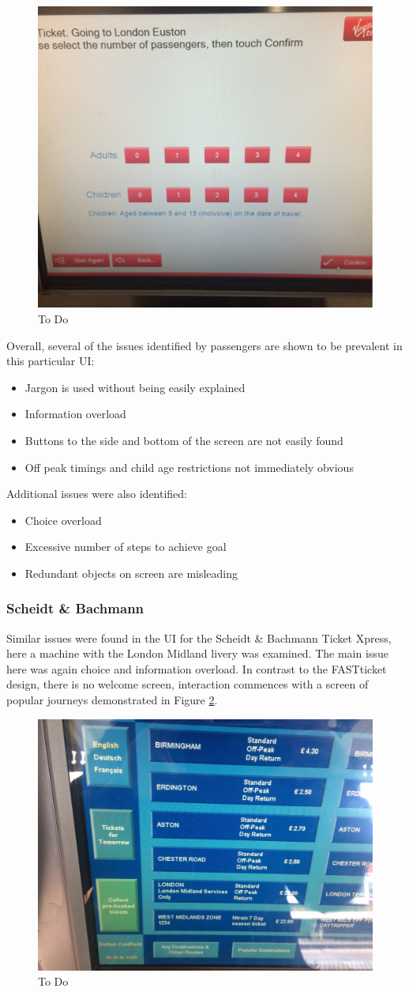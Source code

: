 \begin{figure}[h!]
	\centering
	\includegraphics[width=0.5\linewidth, angle=0, origin=c]{images/image00}
	\caption{To Do}
	\label{fig:passengers}
\end{figure}

\newpage
Overall, several of the issues identified by passengers are shown to be prevalent in this particular UI:
\begin{itemize}
	\item Jargon is used without being easily explained
	\item Information overload
	\item Buttons to the side and bottom of the screen are not easily found
	\item Off peak timings and child age restrictions not immediately obvious
\end{itemize}
Additional issues were also identified:
\begin{itemize}
	\item Choice overload
	\item Excessive number of steps to achieve goal
	\item Redundant objects on screen are misleading
\end{itemize}

\subsubsection{Scheidt \& Bachmann}

Similar issues were found in the UI for the Scheidt \& Bachmann Ticket Xpress, here a machine with the London Midland livery was examined. The main issue here was again choice and information overload. In contrast to the FASTticket design, there is no welcome screen, interaction commences with a screen of popular journeys demonstrated in Figure \ref{fig:midlandSelection}. 

\begin{figure}[h!]
	\centering
	\includegraphics[width=0.5\linewidth, angle=0, origin=c]{images/image08}
	\caption{To Do}
	\label{fig:midlandSelection}
\end{figure}

